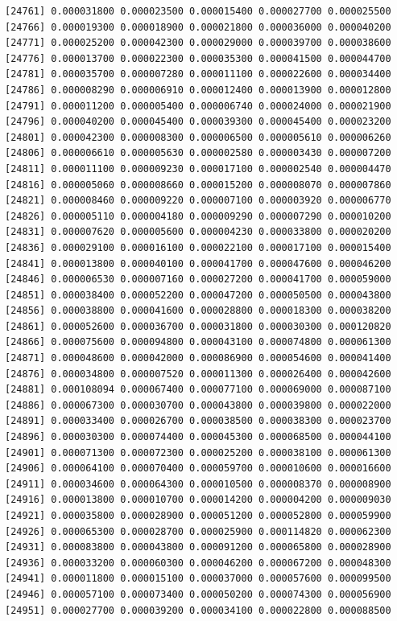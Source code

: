 \documentclass[]{article}
\begin{document}
\begin{verbatim}
[24761] 0.000031800 0.000023500 0.000015400 0.000027700 0.000025500
[24766] 0.000019300 0.000018900 0.000021800 0.000036000 0.000040200
[24771] 0.000025200 0.000042300 0.000029000 0.000039700 0.000038600
[24776] 0.000013700 0.000022300 0.000035300 0.000041500 0.000044700
[24781] 0.000035700 0.000007280 0.000011100 0.000022600 0.000034400
[24786] 0.000008290 0.000006910 0.000012400 0.000013900 0.000012800
[24791] 0.000011200 0.000005400 0.000006740 0.000024000 0.000021900
[24796] 0.000040200 0.000045400 0.000039300 0.000045400 0.000023200
[24801] 0.000042300 0.000008300 0.000006500 0.000005610 0.000006260
[24806] 0.000006610 0.000005630 0.000002580 0.000003430 0.000007200
[24811] 0.000011100 0.000009230 0.000017100 0.000002540 0.000004470
[24816] 0.000005060 0.000008660 0.000015200 0.000008070 0.000007860
[24821] 0.000008460 0.000009220 0.000007100 0.000003920 0.000006770
[24826] 0.000005110 0.000004180 0.000009290 0.000007290 0.000010200
[24831] 0.000007620 0.000005600 0.000004230 0.000033800 0.000020200
[24836] 0.000029100 0.000016100 0.000022100 0.000017100 0.000015400
[24841] 0.000013800 0.000040100 0.000041700 0.000047600 0.000046200
[24846] 0.000006530 0.000007160 0.000027200 0.000041700 0.000059000
[24851] 0.000038400 0.000052200 0.000047200 0.000050500 0.000043800
[24856] 0.000038800 0.000041600 0.000028800 0.000018300 0.000038200
[24861] 0.000052600 0.000036700 0.000031800 0.000030300 0.000120820
[24866] 0.000075600 0.000094800 0.000043100 0.000074800 0.000061300
[24871] 0.000048600 0.000042000 0.000086900 0.000054600 0.000041400
[24876] 0.000034800 0.000007520 0.000011300 0.000026400 0.000042600
[24881] 0.000108094 0.000067400 0.000077100 0.000069000 0.000087100
[24886] 0.000067300 0.000030700 0.000043800 0.000039800 0.000022000
[24891] 0.000033400 0.000026700 0.000038500 0.000038300 0.000023700
[24896] 0.000030300 0.000074400 0.000045300 0.000068500 0.000044100
[24901] 0.000071300 0.000072300 0.000025200 0.000038100 0.000061300
[24906] 0.000064100 0.000070400 0.000059700 0.000010600 0.000016600
[24911] 0.000034600 0.000064300 0.000010500 0.000008370 0.000008900
[24916] 0.000013800 0.000010700 0.000014200 0.000004200 0.000009030
[24921] 0.000035800 0.000028900 0.000051200 0.000052800 0.000059900
[24926] 0.000065300 0.000028700 0.000025900 0.000114820 0.000062300
[24931] 0.000083800 0.000043800 0.000091200 0.000065800 0.000028900
[24936] 0.000033200 0.000060300 0.000046200 0.000067200 0.000048300
[24941] 0.000011800 0.000015100 0.000037000 0.000057600 0.000099500
[24946] 0.000057100 0.000073400 0.000050200 0.000074300 0.000056900
[24951] 0.000027700 0.000039200 0.000034100 0.000022800 0.000088500

\end{verbatim}
\end{document}
